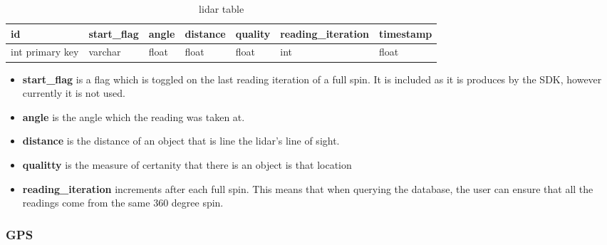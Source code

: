 \begin{table}[!htb]
\centering
\caption{lidar table}
\label{tab:db-lidar}
\begin{tabular}{@{}lllllll@{}}
\toprule
id              & start\_flag & angle & distance & quality & reading\_iteration & timestamp \\ \midrule
int primary key & varchar     & float & float    & float   & int            & float
\end{tabular}
\end{table}
\begin{itemize}
\item{\textbf{start\_flag}} is a flag which is toggled on the last reading iteration of a full spin. It is included as it is produces by the SDK, however currently it is not used.
\item{\textbf{angle}} is the angle which the reading was taken at.
\item{\textbf{distance}} is the distance of an object that is line the lidar's line of sight.
\item{\textbf{qualitty}} is the measure of certanity that there is an object is that location
\item{\textbf{reading\_iteration}} increments after each full spin. This means that when querying the database, the user can ensure that all the readings come from the same 360 degree spin.
\end{itemize}


\subsubsection{GPS}

